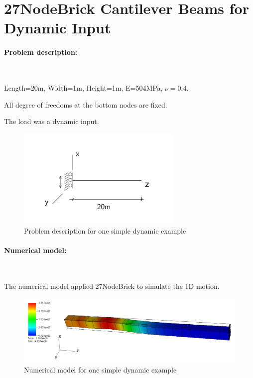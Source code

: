 \documentclass[fleqn,11pt]{article}
\begin{document}
\newpage
\section{27NodeBrick Cantilever Beams for Dynamic Input}



\paragraph{Problem description:} ~



Length=20m, Width=1m, Height=1m, E=504MPa, $\nu=0.4$. 

All degree of freedoms at the bottom nodes are fixed. 

The load was a dynamic input. 


\begin{figure}[H]
  \centering
  \includegraphics[width=8cm]{../Figure-files/dynamic_example_diagram.pdf}
  \caption{Problem description for one simple dynamic example}
  \label{fig Problem description for one simple dynamic example}
\end{figure}



\paragraph{Numerical model:} ~

The numerical model applied 27NodeBrick to simulate the 1D motion. 

\begin{figure}[H]
  \centering
  \includegraphics[width=16cm]{../Figure-files/dynamic_example_numerical.pdf}
  \caption{Numerical model for one simple dynamic example}
  \label{fig Numerical model for one simple dynamic example}
\end{figure}
\end{document}
